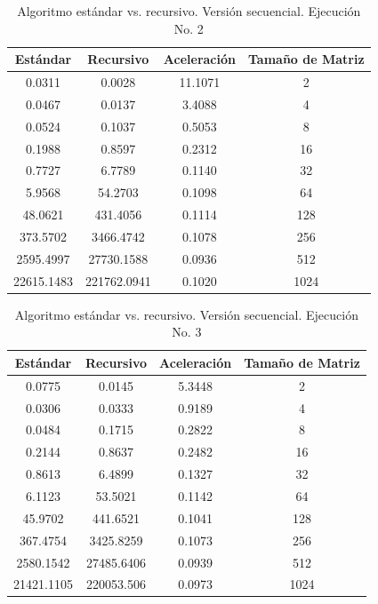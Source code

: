 \documentclass{article}
\begin{document}
\begin{table}[ht]
\centering
\begin{tabular}{|c|c|c|c|}
\hline
\textbf{Estándar} & \textbf{Recursivo} & \textbf{Aceleración} & \textbf{Tamaño de Matriz} \\
\hline
0.0311 & 0.0028 & 11.1071 & 2 \\
0.0467 & 0.0137 & 3.4088 & 4 \\
0.0524 & 0.1037 & 0.5053 & 8 \\
0.1988 & 0.8597 & 0.2312 & 16 \\
0.7727 & 6.7789 & 0.1140 & 32 \\
5.9568 & 54.2703 & 0.1098 & 64 \\
48.0621 & 431.4056 & 0.1114 & 128 \\
373.5702 & 3466.4742 & 0.1078 & 256 \\
2595.4997 & 27730.1588 & 0.0936 & 512 \\
22615.1483 & 221762.0941 & 0.1020 & 1024 \\
\hline
\end{tabular}
\caption{Algoritmo estándar vs. recursivo. Versión secuencial. Ejecución No. 2}
\end{table}

\begin{table}[ht]
\centering
\begin{tabular}{|c|c|c|c|}
\hline
\textbf{Estándar} & \textbf{Recursivo} & \textbf{Aceleración} & \textbf{Tamaño de Matriz} \\
\hline
0.0775 & 0.0145 & 5.3448 & 2 \\
0.0306 & 0.0333 & 0.9189 & 4 \\
0.0484 & 0.1715 & 0.2822 & 8 \\
0.2144 & 0.8637 & 0.2482 & 16 \\
0.8613 & 6.4899 & 0.1327 & 32 \\
6.1123 & 53.5021 & 0.1142 & 64 \\
45.9702 & 441.6521 & 0.1041 & 128 \\
367.4754 & 3425.8259 & 0.1073 & 256 \\
2580.1542 & 27485.6406 & 0.0939 & 512 \\
21421.1105 & 220053.506 & 0.0973 & 1024 \\
\hline
\end{tabular}
\caption{Algoritmo estándar vs. recursivo. Versión secuencial. Ejecución No. 3}
\end{table}
\end{document}

